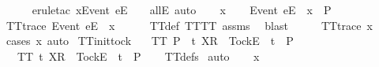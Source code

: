 \begin{isabellebody}
\ \ \ \ \isamarkupfalse%
\ {\isacharparenleft}erule{\isacharunderscore}tac\ x{\isacharequal}{\isachardoublequoteopen}{\isacharbrackleft}Event\ e{\isacharbrackright}\isactrlsub E\ {\isacharhash}\ {\isasymrho}{\isachardoublequoteclose}\ \ allE{\isacharcomma}\ auto{\isacharparenright}\isanewline
{}\isamarkupfalse%
\isanewline
\ \ \isamarkupfalse%
\ x\isanewline
\ \ \isamarkupfalse%
\ {\isachardoublequoteopen}{\isacharbrackleft}Event\ e{\isacharbrackright}\isactrlsub E\ {\isacharhash}\ x\ {\isasymin}\ P{\isachardoublequoteclose}\isanewline
\ \ \isamarkupfalse%
\ \isamarkupfalse%
\ {\isachardoublequoteopen}TT{}{\isacharunderscore}trace\ {\isacharparenleft}{\isacharbrackleft}Event\ e{\isacharbrackright}\isactrlsub E\ {\isacharhash}\ x{\isacharparenright}{\isachardoublequoteclose}\isanewline
\ \ \ \ \isamarkupfalse%
\ TT{}{\isacharunderscore}def\ TT{\isacharunderscore}TT{}\ assms{\isacharparenleft}{}{\isacharparenright}\ \isamarkupfalse%
\ blast\isanewline
\ \ \isamarkupfalse%
\ \isamarkupfalse%
\ {\isachardoublequoteopen}TT{}{\isacharunderscore}trace\ x{\isachardoublequoteclose}\isanewline
\ \ \ \ \isamarkupfalse%
\ {\isacharparenleft}cases\ x{\isacharcomma}\ auto{\isacharparenright}\isanewline
{}\isamarkupfalse%
%
\endisatagproof
{\isafoldproof}%
%
\isadelimproof
\isanewline
%
\endisadelimproof
\isanewline
{}\isamarkupfalse%
\ TT{\isacharunderscore}init{\isacharunderscore}tock{\isacharcolon}\isanewline
\ \ \ {\isachardoublequoteopen}TT\ P{\isachardoublequoteclose}\ {\isachardoublequoteopen}{\isasymexists}\ t{\isachardot}\ {\isacharbrackleft}X{\isacharbrackright}\isactrlsub R\ {\isacharhash}\ {\isacharbrackleft}Tock{\isacharbrackright}\isactrlsub E\ {\isacharhash}\ t\ {\isasymin}\ P{\isachardoublequoteclose}\isanewline
\ \ \ {\isachardoublequoteopen}TT\ {\isacharbraceleft}t{\isachardot}\ {\isacharbrackleft}X{\isacharbrackright}\isactrlsub R\ {\isacharhash}\ {\isacharbrackleft}Tock{\isacharbrackright}\isactrlsub E\ {\isacharhash}\ t\ {\isasymin}\ P{\isacharbraceright}{\isachardoublequoteclose}\isanewline
%
\isadelimproof
\ \ %
\endisadelimproof
%
\isatagproof
{}\isamarkupfalse%
\ TT{\isacharunderscore}defs\isanewline
{}\isamarkupfalse%
\ auto\isanewline
\ \ \isamarkupfalse%
\ x\isanewline
\ \ \isamarkupfalse%

\end{isabellebody}
